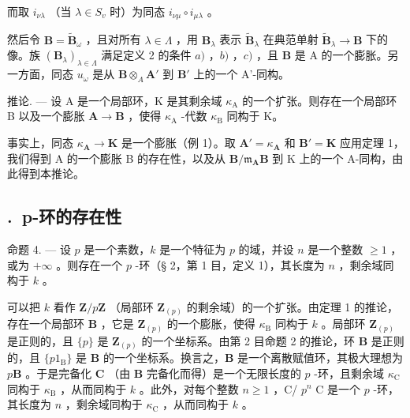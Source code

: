 而取 \(i_{\nu \lambda}\) （当 \(\lambda \in S_{v}\) 时）为同态 \(i_{\nu \mu} \circ i_{\mu \lambda}\) 。

然后令 \(\mathbf{B} = \tilde{\mathbf{B}}_{\omega}\) ，且对所有 \(\lambda \in \Lambda\) ，用 \(\mathbf{B}_{\lambda}\) 表示 \(\tilde{\mathbf{B}}_{\lambda}\) 在典范单射 \(\tilde{\mathbf{B}}_{\lambda} \to \mathbf{B}\) 下的像。族 \((\mathbf{B}_{\lambda})_{\lambda \in \Lambda}\) 满足定义 2 的条件 \(a)\) ，\(b)\) ，\(c)\) ，且 \(\mathbf{B}\) 是 A 的一个膨胀。另一方面，同态 \(u_{\omega}\) 是从 \(\mathbf{B} \otimes_{A} \mathbf{A}'\) 到 \(\mathbf{B}'\) 上的一个 A'-同构。

推论. --- 设 A 是一个局部环，K 是其剩余域 \(\kappa_{\mathrm{A}}\) 的一个扩张。则存在一个局部环 B 以及一个膨胀 \(\mathbf{A} \to \mathbf{B}\) ，使得 \(\kappa_{\mathrm{A}}\) -代数 \(\kappa_{\mathrm{B}}\) 同构于 K。

事实上，同态 \(\kappa_{\mathbf{A}} \to \mathbf{K}\) 是一个膨胀（例 1）。取 \(\mathbf{A}' = \kappa_{\mathbf{A}}\) 和 \(\mathbf{B}' = \mathbf{K}\) 应用定理 1，我们得到 A 的一个膨胀 B 的存在性，以及从 \(\mathbf{B} / \mathfrak{m}_{\mathbf{A}}\mathbf{B}\) 到 K 上的一个 A-同构，由此得到本推论。

\subsection*{\theappendixitem.\ p-环的存在性}
{}

命题 4. --- 设 \(p\) 是一个素数，\(k\) 是一个特征为 \(p\) 的域，并设 \(n\) 是一个整数 \(\geqslant 1\) ，或为 \(+\infty\) 。则存在一个 \(p\) -环（§ 2，第 1 目，定义 1），其长度为 \(n\) ，剩余域同构于 \(k\) 。

可以把 \(k\) 看作 \(\mathbf{Z}/p\mathbf{Z}\) （局部环 \(\mathbf{Z}_{(p)}\) 的剩余域）的一个扩张。由定理 1 的推论，存在一个局部环 \(\mathbf{B}\) ，它是 \(\mathbf{Z}_{(p)}\) 的一个膨胀，使得 \(\kappa_{\mathrm{B}}\) 同构于 \(k\) 。局部环 \(\mathbf{Z}_{(p)}\) 是正则的，且 \(\{p\}\) 是 \(\mathbf{Z}_{(p)}\) 的一个坐标系。由第 2 目命题 2 的推论，环 \(\mathbf{B}\) 是正则的，且 \(\{p1_{\mathrm{B}}\}\) 是 \(\mathbf{B}\) 的一个坐标系。换言之，\(\mathbf{B}\) 是一个离散赋值环，其极大理想为 \(p\mathbf{B}\) 。于是完备化 \(\mathbf{C}\) （由 \(\mathbf{B}\) 完备化而得）是一个无限长度的 \(p\) -环，且剩余域 \(\kappa_{\mathrm{C}}\) 同构于 \(\kappa_{\mathrm{B}}\) ，从而同构于 \(k\) 。此外，对每个整数 \(n \geqslant 1\) ，C/ \(p^{n}\) C 是一个 \(p\) -环，其长度为 \(n\) ，剩余域同构于 \(\kappa_{\mathrm{C}}\) ，从而同构于 \(k\) 。

\setcounter{exercisesection}{0}
